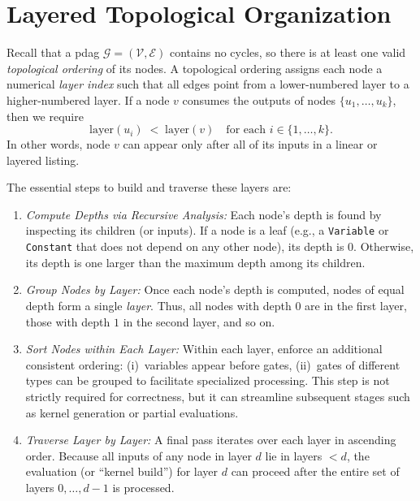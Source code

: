 
\section{Layered Topological Organization}
\label{sec:layered_dag_traversal}

Recall that a \acrshort{pdag} \(\mathcal{G} = (\mathcal{V}, \mathcal{E})\) contains no cycles, so there is at least one valid \emph{topological ordering} of its nodes.  A topological ordering assigns each node a numerical \emph{layer index} such that all edges point from a lower-numbered layer to a higher-numbered layer. If a node \(v\) consumes the outputs of nodes \(\{u_1,\dots,u_k\}\), then we require
\[
\text{layer}(u_i) \;<\; \text{layer}(v)
\quad
\text{for each }i\in\{1,\dots,k\}.
\]
In other words, node \(v\) can appear only after all of its inputs in a linear or layered listing.

The essential steps to build and traverse these layers are:

\begin{enumerate}
    \item \emph{Compute Depths via Recursive Analysis:}  
      Each node’s depth is found by inspecting its children (or inputs).  If a node is a leaf (e.g., a \texttt{Variable} or \texttt{Constant} that does not depend on any other node), its depth is 0.  Otherwise, its depth is one larger than the maximum depth among its children.  

    \item \emph{Group Nodes by Layer:}  
      Once each node’s depth is computed, nodes of equal depth form a single \emph{layer}. Thus, all nodes with depth \(0\) are in the first layer, those with depth \(1\) in the second layer, and so on.  

    \item \emph{Sort Nodes within Each Layer:}  
      Within each layer, enforce an additional consistent ordering: (i)~variables appear before gates, (ii)~gates of different types can be grouped to facilitate specialized processing.  This step is not strictly required for correctness, but it can streamline subsequent stages such as kernel generation or partial evaluations.

    \item \emph{Traverse Layer by Layer:}  
      A final pass iterates over each layer in ascending order.  Because all inputs of any node in layer \(d\) lie in layers \(< d\), the evaluation (or “kernel build”) for layer \(d\) can proceed after the entire set of layers \(0,\dots,d-1\) is processed.
\end{enumerate}

